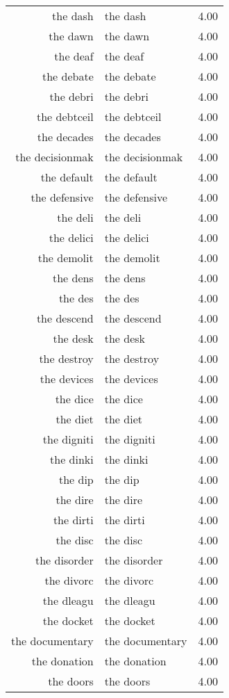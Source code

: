 \begin{table}[ht]
\begin{tabular}{rlr}
  the dash & the dash & 4.00 \\ 
  the dawn & the dawn & 4.00 \\ 
  the deaf & the deaf & 4.00 \\ 
  the debate & the debate & 4.00 \\ 
  the debri & the debri & 4.00 \\ 
  the debtceil & the debtceil & 4.00 \\ 
  the decades & the decades & 4.00 \\ 
  the decisionmak & the decisionmak & 4.00 \\ 
  the default & the default & 4.00 \\ 
  the defensive & the defensive & 4.00 \\ 
  the deli & the deli & 4.00 \\ 
  the delici & the delici & 4.00 \\ 
  the demolit & the demolit & 4.00 \\ 
  the dens & the dens & 4.00 \\ 
  the des & the des & 4.00 \\ 
  the descend & the descend & 4.00 \\ 
  the desk & the desk & 4.00 \\ 
  the destroy & the destroy & 4.00 \\ 
  the devices & the devices & 4.00 \\ 
  the dice & the dice & 4.00 \\ 
  the diet & the diet & 4.00 \\ 
  the digniti & the digniti & 4.00 \\ 
  the dinki & the dinki & 4.00 \\ 
  the dip & the dip & 4.00 \\ 
  the dire & the dire & 4.00 \\ 
  the dirti & the dirti & 4.00 \\ 
  the disc & the disc & 4.00 \\ 
  the disorder & the disorder & 4.00 \\ 
  the divorc & the divorc & 4.00 \\ 
  the dleagu & the dleagu & 4.00 \\ 
  the docket & the docket & 4.00 \\ 
  the documentary & the documentary & 4.00 \\ 
  the donation & the donation & 4.00 \\ 
  the doors & the doors & 4.00 \\ 

\end{tabular}
\end{table}
